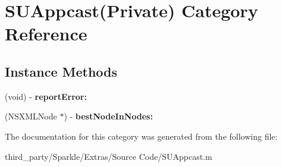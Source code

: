 \hypertarget{category_s_u_appcast_07_private_08}{}\section{S\+U\+Appcast(Private) Category Reference}
\label{category_s_u_appcast_07_private_08}
\subsection*{Instance Methods}
\begin{DoxyCompactItemize}
\item 
\mbox{\label{category_s_u_appcast_07_private_08_a85a3abe38acd7fa75dae6510f09d7751}} 
(void) -\/ {\bfseries report\+Error\+:}
\item 
\mbox{\label{category_s_u_appcast_07_private_08_aec2f04a280d170d750ef2dedf99d546a}} 
(N\+S\+X\+M\+L\+Node $\ast$) -\/ {\bfseries best\+Node\+In\+Nodes\+:}
\end{DoxyCompactItemize}


The documentation for this category was generated from the following file\+:\begin{DoxyCompactItemize}
\item 
third\+\_\+party/\+Sparkle/\+Extras/\+Source Code/S\+U\+Appcast.\+m\end{DoxyCompactItemize}
